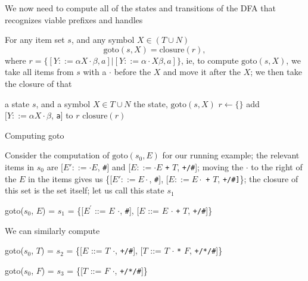 \documentclass[8pt,a4paper,compress]{beamer}
\newcommand{\mm}[1]{$#1$}
\newcommand{\expo}[2]{$#1^{#2}$}
\newcommand{\subs}[2]{${#1}_{#2}$}
\newenvironment{spaced}
{
\smallskip
\hspace{.5cm}
\begin{minipage}[c]{\textwidth}
}
{
\end{minipage}
\smallskip
}
\begin{document}
\begin{frame}[fragile]
\pause

We now need to compute all of the states and transitions of the DFA that recognizes viable prefixes and handles

\pause
\bigskip

For any item set $s$, and any symbol $X \in (T \cup N)$ $$\text{goto}(s, X) = \text{closure}(r),$$ where $r = \{[Y ::= \alpha X \cdot \beta, a] | [Y ::= \alpha \cdot X \beta, a]\}$, ie, to compute $\text{goto}(s,X)$, we take all items from $s$ with a $\cdot$ before the $X$ and move it after the $X$; we then take the closure of that

\pause
\bigskip

\begin{algorithm}[H]
\begin{algorithmic}
\REQUIRE a state $s$, and a symbol $X \in T \cup N$
\ENSURE the state, $\text{goto}(s, X)$
\STATE $r \gets \{\}$
\STATE add $[Y ::= \alpha X \cdot \beta$, \lstinline{a}] to $r$
\ENDFOR
\RETURN $\text{closure}(r)$
\end{algorithmic}
\caption{Computing goto}
\end{algorithm}
\end{frame}

\begin{frame}[fragile]
\pause

Consider the computation of $\text{goto}(s_0, E)$ for our running example; the relevant items in $s_0$ are [$E' ::= \cdot E$, \lstinline{#}] and [$E  ::= \cdot E$ \lstinline{+} $T$, \lstinline{+/#}]; moving the $\cdot$ to the right of the $E$ in the items gives us \{[$E' ::= E \cdot$, \lstinline{#}], [$E  ::= E  \cdot$ \lstinline{+} $T$, \lstinline{+/#]}\}; the closure of this set is the set itself; let us call this state $s_1$

\text{ }
\begin{spaced}
\begin{production}
goto(\subs{s}{0}, \mm{E}) = \subs{s}{1}
                = \{[\expo{E}{\prime} ::= \mm{E} \mm{\cdot}, \lstinline{#}],
                    [\mm{E}  ::= \mm{E} \mm{\cdot} \lstinline{+} \mm{T}, \lstinline{+/#}]\}
\end{production}
\end{spaced}

\pause

We can similarly compute

\text{ }
\begin{spaced}
\begin{production}
goto(\subs{s}{0}, \mm{T}) = \subs{s}{2}
                = \{[\mm{E}  ::= \mm{T} \mm{\cdot}, \lstinline{+/#}],
                    [\mm{T}  ::= \mm{T} \mm{\cdot} \lstinline{*} \mm{F}, \lstinline{+/*/#}]\}

goto(\subs{s}{0}, \mm{F}) = \subs{s}{3}
                = \{[\mm{T}  ::= \mm{F} \mm{\cdot}, \lstinline{+/*/#}]\}
\end{production}
\end{spaced}
\end{frame}
\end{document}
